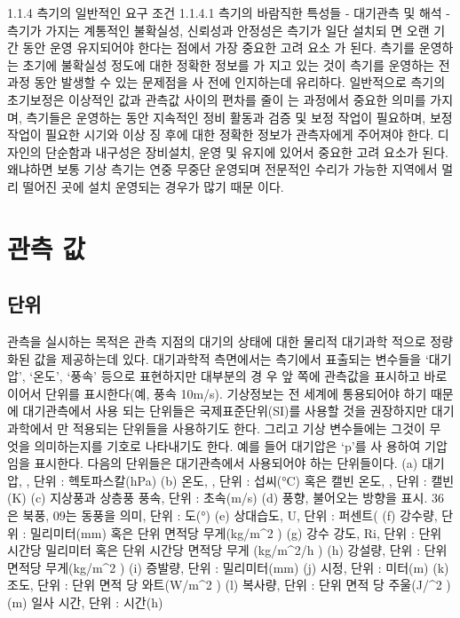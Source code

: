 1.1.4 측기의 일반적인 요구 조건
1.1.4.1 측기의 바람직한 특성들
- 대기관측 및 해석
-
측기가 가지는 계통적인 불확실성, 신뢰성과 안정성은 측기가 일단 설치되
면 오랜 기간 동안 운영 유지되어야 한다는 점에서 가장 중요한 고려 요소
가 된다. 측기를 운영하는 초기에 불확실성 정도에 대한 정확한 정보를 가
지고 있는 것이 측기를 운영하는 전 과정 동안 발생할 수 있는 문제점을 사
전에 인지하는데 유리하다.
일반적으로 측기의 초기보정은 이상적인 값과 관측값 사이의 편차를 줄이
는 과정에서 중요한 의미를 가지며, 측기들은 운영하는 동안 지속적인 정비
활동과 검증 및 보정 작업이 필요하며, 보정 작업이 필요한 시기와 이상 징
후에 대한 정확한 정보가 관측자에게 주어져야 한다.
디자인의 단순함과 내구성은 장비설치, 운영 및 유지에 있어서 중요한 고려
요소가 된다. 왜냐하면 보통 기상 측기는 연중 무중단 운영되며 전문적인
수리가 가능한 지역에서 멀리 떨어진 곳에 설치 운영되는 경우가 많기 때문
이다.

\section{관측 값}
\subsection{단위}

관측을 실시하는 목적은 관측 지점의 대기의 상태에 대한 물리적 대기과학
적으로 정량화된 값을 제공하는데 있다. 대기과학적 측면에서는 측기에서
표출되는 변수들을 ‘대기압’, ‘온도’, ‘풍속’ 등으로 표현하지만 대부분의 경
우 앞 쪽에 관측값을 표시하고 바로 이어서 단위를 표시한다(예, 풍속
10m/s). 기상정보는 전 세계에 통용되어야 하기 때문에 대기관측에서 사용
되는 단위들은 국제표준단위(SI)를 사용할 것을 권장하지만 대기과학에서
만 적용되는 단위들을 사용하기도 한다. 그리고 기상 변수들에는 그것이 무
엇을 의미하는지를 기호로 나타내기도 한다. 예를 들어 대기압은 ‘p’를 사
용하여 기압임을 표시한다.
다음의 단위들은 대기관측에서 사용되어야 하는 단위들이다.
(a) 대기압, , 단위 : 헥토파스칼(hPa)
(b) 온도, , 단위 : 섭씨(°C) 혹은 캘빈 온도, , 단위 : 캘빈(K)
(c) 지상풍과 상층풍 풍속, 단위 : 초속(m/s)
(d) 풍향, 불어오는 방향을 표시. 36은 북풍, 09는 동풍을 의미, 단위 : 도(°)
(e) 상대습도, U, 단위 : 퍼센트(%
(f) 강수량, 단위 : 밀리미터(mm) 혹은 단위 면적당 무게(kg/m^2 )
(g) 강수 강도, Ri, 단위 : 단위 시간당 밀리미터 혹은 단위 시간당 면적당
무게 (kg/m^2/h )
(h) 강설량, 단위 : 단위 면적당 무게(kg/m^2 )
(i) 증발량, 단위 : 밀리미터(mm)
(j) 시정, 단위 : 미터(m)
(k) 조도, 단위 : 단위 면적 당 와트(W/m^2 )
(l) 복사량, 단위 : 단위 면적 당 주울(J/^2 )
(m) 일사 시간, 단위 : 시간(h)

